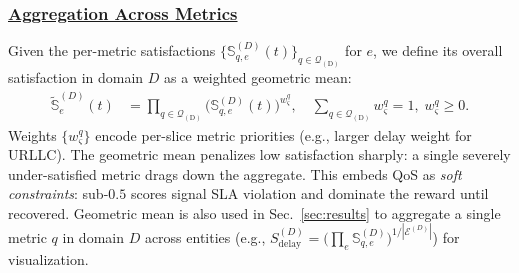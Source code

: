\documentclass[12pt,lettersize,journal,onecolumn]{IEEEtran}
\begin{document}
\subsubsection*{\underline{Aggregation Across Metrics}}\label{subsec:aggregation-metrics}
Given the per-metric satisfactions $\{\mathbb{S}^{(D)}_{q,e}(t)\}_{q\in\mathcal{Q}_\mathrm{(D)}}$ for $e$, we define its overall satisfaction in domain $D$ as a weighted geometric mean:
\begin{align}
\tilde{\mathbb{S}}^{(D)}_{e}(t)
&=
\prod_{q\in\mathcal{Q}_\mathrm{(D)}}
\Big(\mathbb{S}^{(D)}_{q,e}(t)\Big)^{w^{q}_{\varsigma}},
\quad
\sum_{q\in\mathcal{Q}_\mathrm{(D)}}  w^{q}_{\varsigma}=1,\;
w^{q}_{\varsigma}\ge 0.
\label{eq:entity-satisfaction}
\end{align}
Weights $\{w^{q}_{\varsigma}\}$ encode per-slice metric priorities (e.g., larger delay weight for URLLC). The geometric mean penalizes low satisfaction sharply: a single severely under-satisfied metric drags down the aggregate. This embeds QoS as \textit{soft constraints}: sub-$0.5$ scores signal SLA violation and dominate the reward until recovered. Geometric mean is also used in Sec.~\ref{sec:results} to aggregate a single metric $q$ in domain $D$ across entities (e.g., $S^{(D)}_{\mathrm{delay}}=\bigl(\prod_{e}\mathbb{S}^{(D)}_{q,e}\bigr)^{1/|\mathcal{E}^{(D)}|}$) for visualization.


\end{document}
